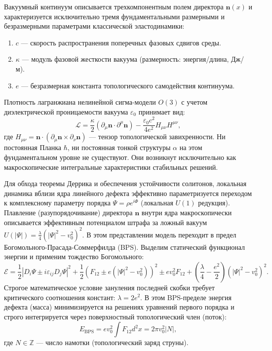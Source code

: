 \documentclass[11pt,a4paper]{article}
\begin{document}
	Вакуумный континуум описывается трехкомпонентным полем директора $\mathbf{n}(x)$ и характеризуется исключительно тремя фундаментальными размерными и безразмерными параметрами классической эластодинамики:
	\begin{enumerate}
		\item $c$ — скорость распространения поперечных фазовых сдвигов среды.
		\item $\kappa$ — модуль фазовой жесткости вакуума (размерность: энергия/длина, Дж/м).
		\item $e$ — безразмерная константа топологического самодействия континуума.
	\end{enumerate}
	Плотность лагранжиана нелинейной сигма-модели $O(3)$ с учетом диэлектрической проницаемости вакуума $\varepsilon_0$ принимает вид:
	\begin{equation}
		\mathcal{L} = \frac{\kappa}{2} (\partial_\mu \mathbf{n} \cdot \partial^\mu \mathbf{n}) - \frac{\varepsilon_0 c^2}{4 e^2} H_{\mu\nu} H^{\mu\nu},
		\label{eq:lagrangian}
	\end{equation}
	где $H_{\mu\nu} = \mathbf{n} \cdot (\partial_\mu \mathbf{n} \times \partial_\nu \mathbf{n})$ — тензор топологической завихренности. Ни постоянная Планка $\hbar$, ни постоянная тонкой структуры $\alpha$ на этом фундаментальном уровне не существуют. Они возникнут исключительно как макроскопические интегральные характеристики стабильных решений.
	
	Для обхода теоремы Деррика и обеспечения устойчивости солитонов, локальная динамика вблизи ядра линейного дефекта эффективно параметризуется переходом к комплексному параметру порядка $\Psi = \rho e^{i\Phi}$ (локальная $U(1)$ редукция). Плавление (разупорядочивание) директора $\mathbf{n}$ внутри ядра макроскопически описывается эффективным потенциалом штрафа за ложный вакуум $U(|\Psi|) = \frac{\lambda}{4}(|\Psi|^2 - v_0^2)^2$. В этом представлении модель переходит в предел Богомольного-Прасада-Соммерфилда (BPS). Выделим статический функционал энергии и применим тождество Богомольного:
	\begin{equation}
		\mathcal{E} = \frac{1}{2} |D_i \Psi \pm i \varepsilon_{ij} D_j \Psi|^2 + \frac{1}{2} \left(F_{12} \pm e(|\Psi|^2 - v_0^2)\right)^2 \pm e v_0^2 F_{12} + \left(\frac{\lambda}{4} - \frac{e^2}{2}\right) (|\Psi|^2 - v_0^2)^2.
	\end{equation}
	Строгое математическое условие зануления последней скобки требует критического соотношения констант: $\lambda = 2e^2$. В этом BPS-пределе энергия дефекта (масса) минимизируется на решениях уравнений первого порядка и строго интегрируется через поверхностный топологический член (поток):
	\begin{equation}
		E_{\text{BPS}} = e v_0^2 \int F_{12} d^2x = 2\pi v_0^2 |N|,
	\end{equation}
	где $N \in \mathbb{Z}$ — число намотки (топологический заряд струны).
	
\end{document}
